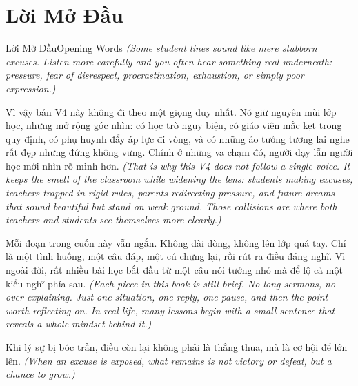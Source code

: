 \chapter*{Lời Mở Đầu}

\begin{truyen}{Lời Mở Đầu}{Opening Words}
\textit{(Some student lines sound like mere stubborn excuses. Listen more carefully and you often hear something real underneath: pressure, fear of disrespect, procrastination, exhaustion, or simply poor expression.)}

Vì vậy bản V4 này không đi theo một giọng duy nhất. Nó giữ nguyên mùi lớp học, nhưng mở rộng góc nhìn: có học trò ngụy biện, có giáo viên mắc kẹt trong quy định, có phụ huynh đẩy áp lực đi vòng, và có những ảo tưởng tương lai nghe rất đẹp nhưng đứng không vững. Chính ở những va chạm đó, người dạy lẫn người học mới nhìn rõ mình hơn.
\textit{(That is why this V4 does not follow a single voice. It keeps the smell of the classroom while widening the lens: students making excuses, teachers trapped in rigid rules, parents redirecting pressure, and future dreams that sound beautiful but stand on weak ground. Those collisions are where both teachers and students see themselves more clearly.)}

Mỗi đoạn trong cuốn này vẫn ngắn. Không dài dòng, không lên lớp quá tay. Chỉ là một tình huống, một câu đáp, một cú chững lại, rồi rút ra điều đáng nghĩ. Vì ngoài đời, rất nhiều bài học bắt đầu từ một câu nói tưởng nhỏ mà để lộ cả một kiểu nghĩ phía sau.
\textit{(Each piece in this book is still brief. No long sermons, no over-explaining. Just one situation, one reply, one pause, and then the point worth reflecting on. In real life, many lessons begin with a small sentence that reveals a whole mindset behind it.)}
\end{truyen}

\begin{baihoc}
Khi lý sự bị bóc trần, điều còn lại không phải là thắng thua, mà là cơ hội để lớn lên.
\textit{(When an excuse is exposed, what remains is not victory or defeat, but a chance to grow.)}
\end{baihoc}
\ngancach